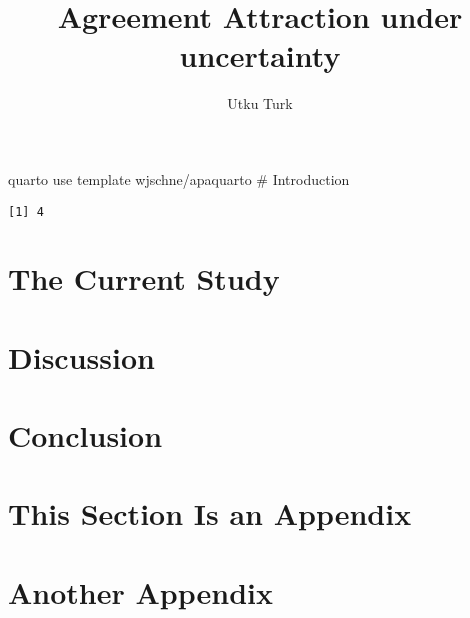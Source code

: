 \documentclass[
  man,
  longtable,
  nolmodern,
  notxfonts,
  notimes,
  colorlinks=true,linkcolor=blue,citecolor=blue,urlcolor=blue]{apa7}
\title{Agreement Attraction under uncertainty}
\author{Utku Turk}
\affiliation{
{Department of Linguistics, University of Maryland}}
\begin{document}
\maketitle




\setlength\LTleft{0pt}




quarto use template wjschne/apaquarto \# Introduction

\begin{verbatim}
[1] 4
\end{verbatim}

\section{The Current Study}\label{the-current-study}

\section{Discussion}\label{discussion}

\section{Conclusion}\label{conclusion}

\appendix

\section{This Section Is an Appendix}\label{apx-a}

\section{Another Appendix}\label{apx-b}
\end{document}
